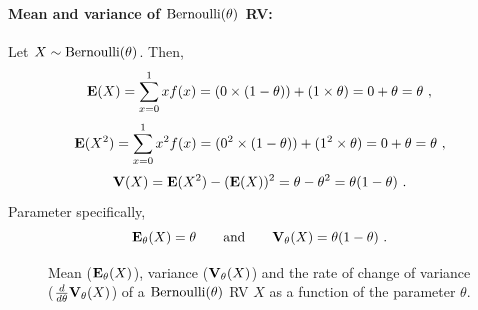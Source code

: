 \paragraph{Mean and variance of $\mbox{{\rm Bernoulli}}(\theta)$ RV:}
Let $X \sim \mbox{{\rm Bernoulli}}(\theta)$.  Then, 
\[
\mathbf{E}(X) = \sum_{x=0}^1 x f(x) = (0 \times (1-\theta)) + (1 \times \theta) = 0+\theta=\theta \ ,
\]
\[
\e(X^2) =  \sum_{x=0}^1 x^2 f(x) =  (0^2 \times (1-\theta) ) + (1^2 \times \theta) = 0+\theta= \theta \ ,
\]
\[
\mathbf{V}(X) = \mathbf{E}(X^2) - (\mathbf{E}(X))^2 = \theta - \theta^2 = \theta(1-\theta) \ .
\]
Parameter specifically,
\[
\mathbf{E}_{\theta}(X)=\theta \qquad \text{and} \qquad \mathbf{V}_{\theta}(X)=\theta(1-\theta) \ .
\]
\begin{figure}[htpb]
\caption{Mean ($\mathbf{E}_{\theta}(X)$), variance ($\mathbf{V}_{\theta}(X)$) and the rate of change of variance ($\frac{d}{d \theta} \mathbf{V}_{\theta}(X)$) of a $\mbox{{\rm Bernoulli}}(\theta)$ RV $X$ as a function of the parameter $\theta$.\label{F:MeanVarBernoulli}}
\centering   {}
\end{figure}

